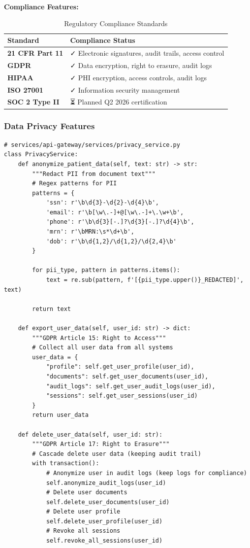 \textbf{Compliance Features:}
\begin{table}[h]
\centering
\caption{Regulatory Compliance Standards}
\begin{tabularx}{\textwidth}{lX}
\toprule
\textbf{Standard} & \textbf{Compliance Status} \\
\midrule
\textbf{21 CFR Part 11} & ✓ Electronic signatures, audit trails, access control \\
\textbf{GDPR} & ✓ Data encryption, right to erasure, audit logs \\
\textbf{HIPAA} & ✓ PHI encryption, access controls, audit logs \\
\textbf{ISO 27001} & ✓ Information security management \\
\textbf{SOC 2 Type II} & ⏳ Planned Q2 2026 certification \\
\bottomrule
\end{tabularx}
\end{table}

\subsubsection{Data Privacy Features}

\begin{lstlisting}[style=pythonstyle]
# services/api-gateway/services/privacy_service.py
class PrivacyService:
    def anonymize_patient_data(self, text: str) -> str:
        """Redact PII from document text"""
        # Regex patterns for PII
        patterns = {
            'ssn': r'\b\d{3}-\d{2}-\d{4}\b',
            'email': r'\b[\w\.-]+@[\w\.-]+\.\w+\b',
            'phone': r'\b\d{3}[-.]?\d{3}[-.]?\d{4}\b',
            'mrn': r'\bMRN:\s*\d+\b',
            'dob': r'\b\d{1,2}/\d{1,2}/\d{2,4}\b'
        }
        
        for pii_type, pattern in patterns.items():
            text = re.sub(pattern, f'[{pii_type.upper()}_REDACTED]', text)
        
        return text
    
    def export_user_data(self, user_id: str) -> dict:
        """GDPR Article 15: Right to Access"""
        # Collect all user data from all systems
        user_data = {
            "profile": self.get_user_profile(user_id),
            "documents": self.get_user_documents(user_id),
            "audit_logs": self.get_user_audit_logs(user_id),
            "sessions": self.get_user_sessions(user_id)
        }
        return user_data
    
    def delete_user_data(self, user_id: str):
        """GDPR Article 17: Right to Erasure"""
        # Cascade delete user data (keeping audit trail)
        with transaction():
            # Anonymize user in audit logs (keep logs for compliance)
            self.anonymize_audit_logs(user_id)
            # Delete user documents
            self.delete_user_documents(user_id)
            # Delete user profile
            self.delete_user_profile(user_id)
            # Revoke all sessions
            self.revoke_all_sessions(user_id)
\end{lstlisting}

